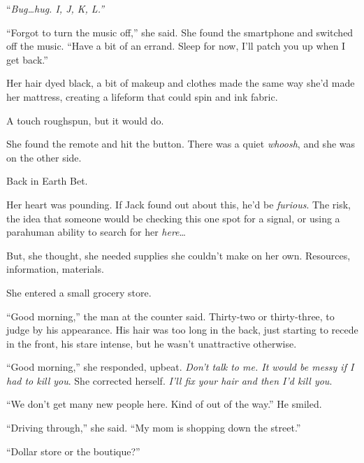 ``\emph{Bug\ldots hug.  I, J, K, L.''}



``Forgot to turn the music off,'' she said.  She found the smartphone and switched off the music.  ``Have a bit of an errand.  Sleep for now, I'll patch you up when I get back.''



Her hair dyed black, a bit of makeup and clothes made the same way she'd made her mattress, creating a lifeform that could spin and ink fabric.



A touch roughspun, but it would do.



She found the remote and hit the button.  There was a quiet \emph{whoosh}, and she was on the other side.



Back in Earth Bet.



Her heart was pounding.  If Jack found out about this, he'd be \emph{furious}.  The risk, the idea that someone would be checking this one spot for a signal, or using a parahuman ability to search for her \emph{here}\ldots



But, she thought, she needed supplies she couldn't make on her own.  Resources, information, materials.



She entered a small grocery store.



``Good morning,'' the man at the counter said.  Thirty-two or thirty-three, to judge by his appearance.  His hair was too long in the back, just starting to recede in the front, his stare intense, but he wasn't unattractive otherwise.



``Good morning,'' she responded, upbeat.  \emph{Don't talk to me.  It would be messy if I had to kill you}.  She corrected herself.  \emph{I'll fix your hair and then I'd kill you}.



``We don't get many new people here.  Kind of out of the way.''  He smiled.



``Driving through,'' she said.  ``My mom is shopping down the street.''



``Dollar store or the boutique?''



